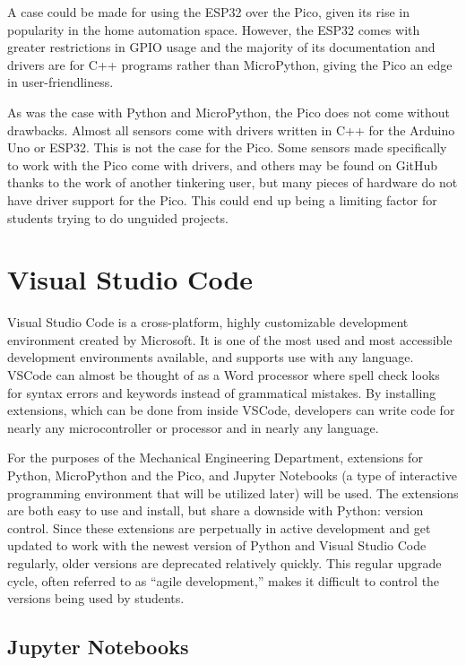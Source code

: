 A case could be made for using the ESP32 over the Pico, given its rise in popularity in the home
automation space. However, the ESP32 comes with greater restrictions in GPIO usage and the majority
of its documentation and drivers are for C++ programs rather than MicroPython, giving the Pico an
edge in user-friendliness.

As was the case with Python and MicroPython, the Pico does not come without drawbacks. Almost all 
sensors come with drivers written in C++ for the Arduino Uno or ESP32. This is not the case for 
the Pico. Some sensors made specifically to work with the Pico come with drivers, and others may 
be found on GitHub thanks to the work of another tinkering user, but many pieces of hardware do 
not have driver support for the Pico. This could end up being a limiting factor for students trying 
to do unguided projects.

\section{Visual Studio Code}

Visual Studio Code is a cross-platform, highly customizable development environment created by
Microsoft. It is one of the most used and most accessible development environments available, 
and supports use with any language. VSCode can almost be thought of as a Word processor where 
spell check looks for syntax errors and keywords instead of grammatical mistakes. By installing
extensions, which can be done from inside VSCode, developers can write code for nearly any 
microcontroller or processor and in nearly any language.

For the purposes of the Mechanical Engineering Department, extensions for Python, MicroPython and
the Pico, and Jupyter Notebooks (a type of interactive programming environment that will be utilized
later) will be used. The extensions are both easy to use and install, but share a downside with
Python: version control. Since these extensions are perpetually in active development and get updated
to work with the newest version of Python and Visual Studio Code regularly, older versions are deprecated 
relatively quickly. This regular upgrade cycle, often referred to as ``agile development,'' makes it 
difficult to control the versions being used by students.

\subsection{Jupyter Notebooks}

